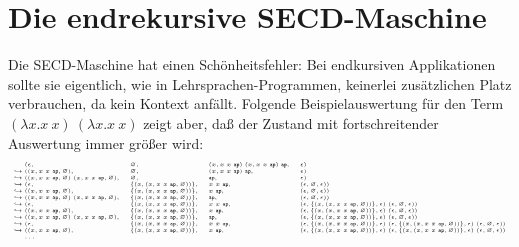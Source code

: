 \section{Die endrekursive SECD-Maschine}

Die SECD-Maschine hat einen Schönheitsfehler: Bei endkursiven
Applikationen sollte sie eigentlich, wie in Lehrsprachen-Programmen, keinerlei
zusätzlichen Platz verbrauchen, da kein Kontext anfällt.  Folgende
Beispielauswertung für den Term $(\lambda x.x~x)~(\lambda x.x~x)$
zeigt aber, daß der Zustand mit fortschreitender Auswertung immer
größer wird:
%
\begin{displaymath}\tiny
  \begin{array}{l@{}llll}
&(\epsilon, &\varnothing, &(x, x~x~\mathtt{ap})~(x, x~x~\mathtt{ap})~\mathtt{ap}, &\epsilon)\\
\hookrightarrow{}&((x, x~x~\mathtt{ap}, \varnothing), &\varnothing, &(x, x~x~\mathtt{ap})~\mathtt{ap}, &\epsilon)\\
\hookrightarrow{}&((x, x~x~\mathtt{ap}, \varnothing)~(x, x~x~\mathtt{ap}, \varnothing), &\varnothing, &\mathtt{ap}, &\epsilon)\\
\hookrightarrow{}&(\epsilon, &\{(x, (x, x~x~\mathtt{ap}, \varnothing))\}, &x~x~\mathtt{ap}, &(\epsilon, \varnothing, \epsilon))\\
\hookrightarrow{}&((x, x~x~\mathtt{ap}, \varnothing), &\{(x, (x, x~x~\mathtt{ap}, \varnothing))\}, &x~\mathtt{ap}, &(\epsilon, \varnothing, \epsilon))\\
\hookrightarrow{}&((x, x~x~\mathtt{ap}, \varnothing)~(x, x~x~\mathtt{ap}, \varnothing), &\{(x, (x, x~x~\mathtt{ap}, \varnothing))\}, &\mathtt{ap}, &(\epsilon, \varnothing, \epsilon))\\
\hookrightarrow{}&(\epsilon, &\{(x, (x, x~x~\mathtt{ap}, \varnothing))\}, &x~x~\mathtt{ap}, &(\epsilon, \{(x, (x, x~x~\mathtt{ap}, \varnothing))\}, \epsilon)~(\epsilon, \varnothing, \epsilon))\\
\hookrightarrow{}&((x, x~x~\mathtt{ap}, \varnothing), &\{(x, (x, x~x~\mathtt{ap}, \varnothing))\}, &x~\mathtt{ap}, &(\epsilon, \{(x, (x, x~x~\mathtt{ap}, \varnothing))\}, \epsilon)~(\epsilon, \varnothing, \epsilon))\\
\hookrightarrow{}&((x, x~x~\mathtt{ap}, \varnothing)~(x, x~x~\mathtt{ap}, \varnothing), &\{(x, (x, x~x~\mathtt{ap}, \varnothing))\}, &\mathtt{ap}, &(\epsilon, \{(x, (x, x~x~\mathtt{ap}, \varnothing))\}, \epsilon)~(\epsilon, \varnothing, \epsilon))\\
\hookrightarrow{}&(\epsilon, &\{(x, (x, x~x~\mathtt{ap}, \varnothing))\}, &x~x~\mathtt{ap}, &(\epsilon, \{(x, (x, x~x~\mathtt{ap}, \varnothing))\}, \epsilon)~(\epsilon, \{(x, (x, x~x~\mathtt{ap}, \varnothing))\}, \epsilon)~(\epsilon, \varnothing, \epsilon))\\
\hookrightarrow{}&((x, x~x~\mathtt{ap}, \varnothing), &\{(x, (x, x~x~\mathtt{ap}, \varnothing))\}, &x~\mathtt{ap}, &(\epsilon, \{(x, (x, x~x~\mathtt{ap}, \varnothing))\}, \epsilon)~(\epsilon, \{(x, (x, x~x~\mathtt{ap}, \varnothing))\}, \epsilon)~(\epsilon, \varnothing, \epsilon))
\\
& \ldots
  \end{array}
\end{displaymath}
